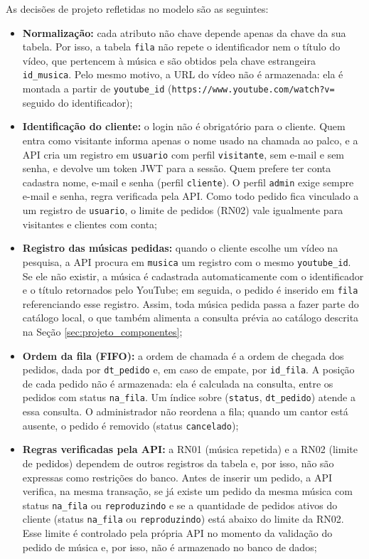 As decisões de projeto refletidas no modelo são as seguintes:

\begin{itemize}
  \item \textbf{Normalização:} cada atributo não chave depende apenas da chave da sua tabela. Por isso, a tabela \texttt{fila} não repete o identificador nem o título do vídeo, que pertencem à música e são obtidos pela chave estrangeira \texttt{id\_musica}. Pelo mesmo motivo, a URL do vídeo não é armazenada: ela é montada a partir de \texttt{youtube\_id} (\texttt{https://www.youtube.com/watch?v=} seguido do identificador);
  \item \textbf{Identificação do cliente:} o login não é obrigatório para o cliente. Quem entra como visitante informa apenas o nome usado na chamada ao palco, e a API cria um registro em \texttt{usuario} com perfil \texttt{visitante}, sem e-mail e sem senha, e devolve um token JWT para a sessão. Quem prefere ter conta cadastra nome, e-mail e senha (perfil \texttt{cliente}). O perfil \texttt{admin} exige sempre e-mail e senha, regra verificada pela API. Como todo pedido fica vinculado a um registro de \texttt{usuario}, o limite de pedidos (RN02) vale igualmente para visitantes e clientes com conta;
  \item \textbf{Registro das músicas pedidas:} quando o cliente escolhe um vídeo na pesquisa, a API procura em \texttt{musica} um registro com o mesmo \texttt{youtube\_id}. Se ele não existir, a música é cadastrada automaticamente com o identificador e o título retornados pelo YouTube; em seguida, o pedido é inserido em \texttt{fila} referenciando esse registro. Assim, toda música pedida passa a fazer parte do catálogo local, o que também alimenta a consulta prévia ao catálogo descrita na Seção \ref{sec:projeto_componentes};
  \item \textbf{Ordem da fila (FIFO):} a ordem de chamada é a ordem de chegada dos pedidos, dada por \texttt{dt\_pedido} e, em caso de empate, por \texttt{id\_fila}. A posição de cada pedido não é armazenada: ela é calculada na consulta, entre os pedidos com status \texttt{na\_fila}. Um índice sobre (\texttt{status}, \texttt{dt\_pedido}) atende a essa consulta. O administrador não reordena a fila; quando um cantor está ausente, o pedido é removido (status \texttt{cancelado});
  \item \textbf{Regras verificadas pela API:} a RN01 (música repetida) e a RN02 (limite de pedidos) dependem de outros registros da tabela e, por isso, não são expressas como restrições do banco. Antes de inserir um pedido, a API verifica, na mesma transação, se já existe um pedido da mesma música com status \texttt{na\_fila} ou \texttt{reproduzindo} e se a quantidade de pedidos ativos do cliente (status \texttt{na\_fila} ou \texttt{reproduzindo}) está abaixo do limite da RN02. Esse limite é controlado pela própria API no momento da validação do pedido de música e, por isso, não é armazenado no banco de dados;

\end{itemize}
